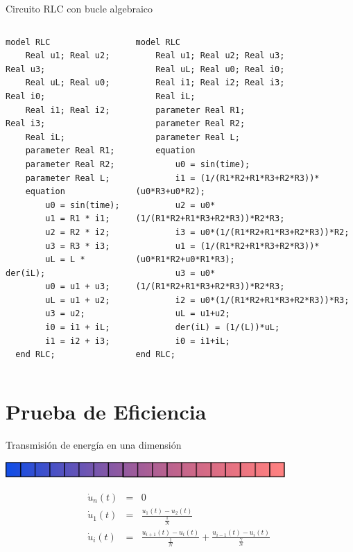 \begin{frame}[fragile]{Circuito RLC con bucle algebraico}
   \fontsize{7pt}{7.2}\selectfont
    \begin{columns}
        \begin{column}{0.4\textwidth}
        \begin{lstlisting}[language=Modelica]
model RLC
    Real u1; Real u2; Real u3;
    Real uL; Real u0; Real i0;
    Real i1; Real i2; Real i3;
    Real iL;
    parameter Real R1;
    parameter Real R2;
    parameter Real L;
    equation
        u0 = sin(time);
        u1 = R1 * i1;
        u2 = R2 * i2;
        u3 = R3 * i3; 
        uL = L * der(iL); 
        u0 = u1 + u3; 
        uL = u1 + u2;
        u3 = u2;
        i0 = i1 + iL;
        i1 = i2 + i3;
  end RLC;
        \end{lstlisting}
        \end{column}
        \begin{column}{0.6\textwidth}
        \begin{lstlisting}[language=Modelica]
model RLC
    Real u1; Real u2; Real u3;
    Real uL; Real u0; Real i0;
    Real i1; Real i2; Real i3;
    Real iL;
    parameter Real R1;
    parameter Real R2;
    parameter Real L;
    equation
        u0 = sin(time);
        i1 = (1/(R1*R2+R1*R3+R2*R3))*(u0*R3+u0*R2);
        u2 = u0*(1/(R1*R2+R1*R3+R2*R3))*R2*R3;
        i3 = u0*(1/(R1*R2+R1*R3+R2*R3))*R2;
        u1 = (1/(R1*R2+R1*R3+R2*R3))*(u0*R1*R2+u0*R1*R3);
        u3 = u0*(1/(R1*R2+R1*R3+R2*R3))*R2*R3;
        i2 = u0*(1/(R1*R2+R1*R3+R2*R3))*R3;
        uL = u1+u2;
        der(iL) = (1/(L))*uL;
        i0 = i1+iL;
end RLC;
        \end{lstlisting}
        \end{column}
    \end{columns}
\end{frame}

\section{Prueba de Eficiencia}

\begin{frame}{Transmisión de energía en una dimensión}
    \begin{center}
        \includegraphics[width=0.8\textwidth]{graphics/heat_transfer.eps}
    \end{center}
    \pause
    \begin{eqnarray*}
        \dot{u}_{n}(t) & = & 0\\
        \dot{u}_{1}(t) & = & \frac{u_{1}(t)-u_{2}(t)}{\frac{1}{N}}\\
        \dot{u}_{i}(t) & = & \frac{u_{i+1}(t)-u_{i}(t)}{\frac{1}{N}}+\frac{u_{i-1}(t)-u_{i}(t)}{\frac{\gamma}{N}}\;
    \end{eqnarray*}
\end{frame}


